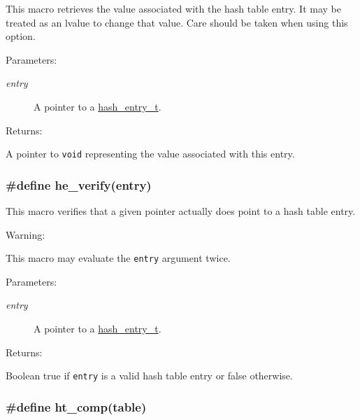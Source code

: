 This macro retrieves the value associated with the hash table entry. It may be treated as an lvalue to change that value. Care should be taken when using this option.\begin{Desc}
\item[Parameters: ]\par
\begin{description}
\item[{\em 
entry}]A pointer to a \hyperlink{group__dbprim__hash_a1}{hash\_\-entry\_\-t}.\end{description}
\end{Desc}
\begin{Desc}
\item[Returns: ]\par
A pointer to {\tt void} representing the value associated with this entry. \end{Desc}
\hypertarget{group__dbprim__hash_a30}{
\subsubsection[he\_\-verify]{\setlength{\rightskip}{0pt plus 5cm}\#define he\_\-verify(entry)}}
\label{group__dbprim__hash_a30}


This macro verifies that a given pointer actually does point to a hash table entry.

\begin{Desc}
\item[Warning: ]\par
This macro may evaluate the {\tt entry} argument twice.\end{Desc}
\begin{Desc}
\item[Parameters: ]\par
\begin{description}
\item[{\em 
entry}]A pointer to a \hyperlink{group__dbprim__hash_a1}{hash\_\-entry\_\-t}.\end{description}
\end{Desc}
\begin{Desc}
\item[Returns: ]\par
Boolean true if {\tt entry} is a valid hash table entry or false otherwise. \end{Desc}
\hypertarget{group__dbprim__hash_a25}{
\subsubsection[ht\_\-comp]{\setlength{\rightskip}{0pt plus 5cm}\#define ht\_\-comp(table)}}
\label{group__dbprim__hash_a25}


